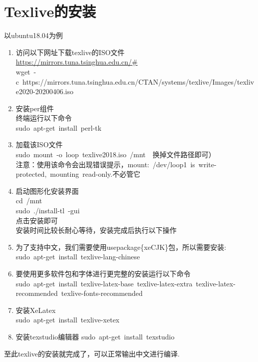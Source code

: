 \documentclass[10pt, oneside, a4paper]{article}      %
\begin{document}

\section{\textrm{Texlive}的安装}
以\textrm{ubuntu18.04}为例
\begin{enumerate}
	\item 访问以下网址下载texlive的ISO文件\\
		\url{https://mirrors.tuna.tsinghua.edu.cn/#}\\
		\textrm{wget~-c~https://mirrors.tuna.tsinghua.edu.cn/CTAN/systems/texlive/Images/texlive2020-20200406.iso}
	\item 安装\textrm{per}组件\\
终端运行以下命令\\
\textrm{sudo~apt-get~install~perl-tk}
\item 加载该ISO文件\\
	\textrm{sudo~mount~-o~loop~texlive2018.iso~/mnt}~~换掉文件路径即可）\\
	注意：使用该命令会出现错误提示，\textrm{mount:~/dev/loop1~is~write-protected,~mounting~read-only.}不必管它
\item 启动图形化安装界面\\
	\textrm{cd~/mnt}\\
	\textrm{sudo~./install-tl~-gui}\\
点击安装即可\\
安装时间比较长耐心等待，安装完成后执行以下操作
\item 为了支持中文，我们需要使用\textrm{usepackage\{xeCJK\}}包，所以需要安装:\\
	\textrm{sudo~apt-get~install~texlive-lang-chinese}
\item 要使用更多软件包和字体进行更完整的安装运行以下命令\\
	\textrm{sudo~apt-get~install~texlive-latex-base~texlive-latex-extra~texlive-latex-recommended~texlive-fonts-recommended}
\item 安装\textrm{XeLatex}\\
	\textrm{sudo~apt-get~install~texlive-xetex}
\item 安装\textrm{texstudio}编辑器
	\textrm{sudo~apt-get~install~texstudio}
\end{enumerate}
至此\textrm{texlive}的安装就完成了，可以正常输出中文进行编译.
\end{document}
